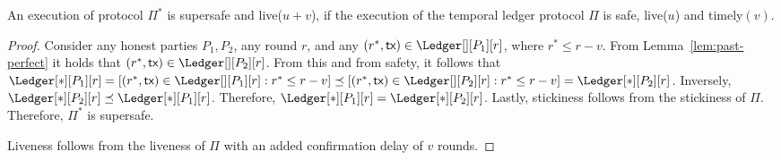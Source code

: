 \begin{theorem}
  An execution of protocol $\Pi^*$ is supersafe and live($u + v$), if the execution of the
  temporal ledger protocol $\Pi$ is safe, live($u$) and timely$(v)$.
\end{theorem}
\begin{proof}
  Consider any honest parties $P_1,P_2$, any round $r$, and any
  $(r^*, \tx) \in \Ledger[][P_1][r]$, where $r^* \leq r - v$.
  From Lemma~\ref{lem:past-perfect} it holds that
  $(r^*, \tx) \in \Ledger[][P_2][r]$.
  From this and from safety, it follows that
  $\Ledger[*][P_1][r] = [(r^*, \tx) \in \Ledger[][P_1][r]: r^* \leq r - v] \preceq
  [(r^*, \tx) \in \Ledger[][P_2][r]: r^* \leq r - v] = \Ledger[*][P_2][r]$.
  Inversely, $\Ledger[*][P_2][r] \preceq \Ledger[*][P_1][r]$.
  Therefore, $\Ledger[*][P_1][r] = \Ledger[*][P_2][r]$.
  Lastly, stickiness follows from the stickiness of $\Pi$.
  Therefore, $\Pi^*$ is supersafe.


  Liveness follows from the liveness of $\Pi$ with an added
  confirmation delay of $v$ rounds.
  \Qed
\end{proof}

